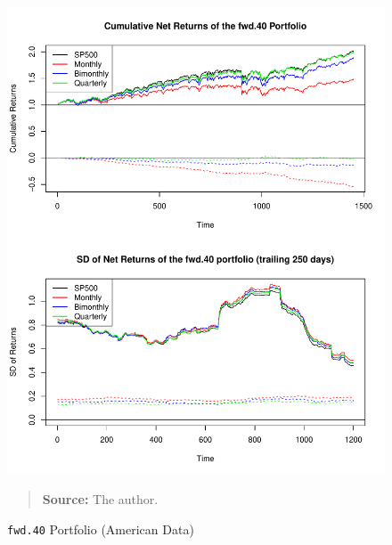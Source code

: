 \documentclass[preprint, doubleblind, authoryear,10pt]{elsarticle}
\begin{document}
\begin{figure}[htpb]
\centering
\footnotesize
\caption{\texttt{fwd.40} Portfolio (American Data)}
\label{fig:spy:fwd.40}
\includegraphics[width=.95\linewidth]{./figs/SP500-retac-fwd-40.pdf}
\begin{quote}
\textbf{Source:} The author.
\end{quote}
\end{figure}

\end{document}
